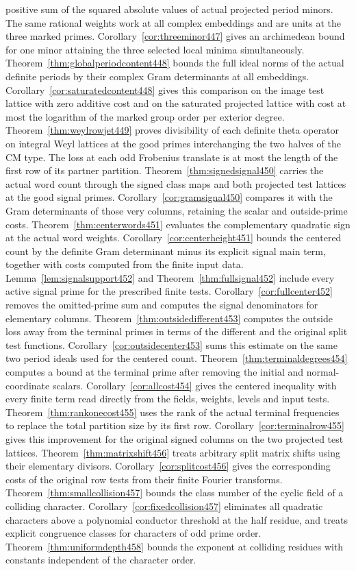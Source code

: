 \documentclass[a4paper,11pt]{article}
\theoremstyle{definition}
\theoremstyle{remark}
\numberwithin{equation}{section}
\begin{document}
positive sum of the squared absolute values of actual projected period minors. The same rational weights work at all complex embeddings and are units at the three marked primes. Corollary~\ref{cor:threeminor447} gives an archimedean bound for one minor attaining the three selected local minima simultaneously. Theorem~\ref{thm:globalperiodcontent448} bounds the full ideal norms of the actual definite periods by their complex Gram determinants at all embeddings. Corollary~\ref{cor:saturatedcontent448} gives this comparison on the image test lattice with zero additive cost and on the saturated projected lattice with cost at most the logarithm of the marked group order per exterior degree. Theorem~\ref{thm:weylrowjet449} proves divisibility of each definite theta operator on integral Weyl lattices at the good primes interchanging the two halves of the CM type. The loss at each odd Frobenius translate is at most the length of the first row of its partner partition. Theorem~\ref{thm:signedsignal450} carries the actual word count through the signed class maps and both projected test lattices at the good signal primes. Corollary~\ref{cor:gramsignal450} compares it with the Gram determinants of those very columns, retaining the scalar and outside-prime costs. Theorem~\ref{thm:centerwords451} evaluates the complementary quadratic sign at the actual word weights. Corollary~\ref{cor:centerheight451} bounds the centered count by the definite Gram determinant minus its explicit signal main term, together with costs computed from the finite input data. Lemma~\ref{lem:signalsupport452} and Theorem~\ref{thm:fullsignal452} include every active signal prime for the prescribed finite tests. Corollary~\ref{cor:fullcenter452} removes the omitted-prime sum and computes the signal denominators for elementary columns. Theorem~\ref{thm:outsidedifferent453} computes the outside loss away from the terminal primes in terms of the different and the original split test functions. Corollary~\ref{cor:outsidecenter453} sums this estimate on the same two period ideals used for the centered count. Theorem~\ref{thm:terminaldegrees454} computes a bound at the terminal prime after removing the initial and normal-coordinate scalars. Corollary~\ref{cor:allcost454} gives the centered inequality with every finite term read directly from the fields, weights, levels and input tests. Theorem~\ref{thm:rankonecost455} uses the rank of the actual terminal frequencies to replace the total partition size by its first row. Corollary~\ref{cor:terminalrow455} gives this improvement for the original signed columns on the two projected test lattices. Theorem~\ref{thm:matrixshift456} treats arbitrary split matrix shifts using their elementary divisors. Corollary~\ref{cor:splitcost456} gives the corresponding costs of the original row tests from their finite Fourier transforms. Theorem~\ref{thm:smallcollision457} bounds the class number of the cyclic field of a colliding character. Corollary~\ref{cor:fixedcollision457} eliminates all quadratic characters above a polynomial conductor threshold at the half residue, and treats explicit congruence classes for characters of odd prime order. Theorem~\ref{thm:uniformdepth458} bounds the exponent at colliding residues with constants independent of the character order. 
\end{document}
